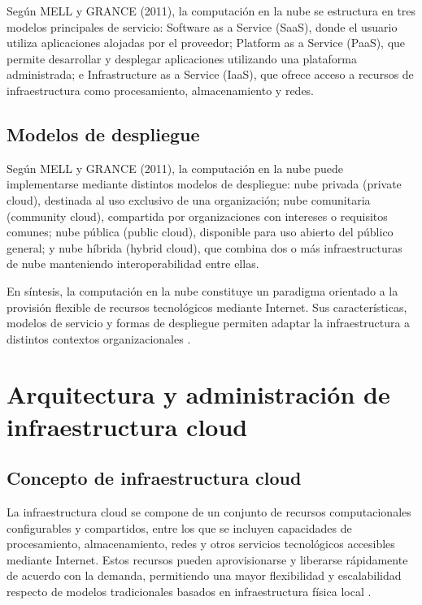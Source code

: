Según MELL y GRANCE (2011), la computación en la nube se estructura en tres modelos principales de servicio: Software as a Service (SaaS), donde el usuario utiliza aplicaciones alojadas por el proveedor; Platform as a Service (PaaS), que permite desarrollar y desplegar aplicaciones utilizando una plataforma administrada; e Infrastructure as a Service (IaaS), que ofrece acceso a recursos de infraestructura como procesamiento, almacenamiento y redes.

\subsection{Modelos de despliegue}

Según MELL y GRANCE (2011), la computación en la nube puede implementarse mediante distintos modelos de despliegue: nube privada (private cloud), destinada al uso exclusivo de una organización; nube comunitaria (community cloud), compartida por organizaciones con intereses o requisitos comunes; nube pública (public cloud), disponible para uso abierto del público general; y nube híbrida (hybrid cloud), que combina dos o más infraestructuras de nube manteniendo interoperabilidad entre ellas.

En síntesis, la computación en la nube constituye un paradigma orientado a la provisión flexible de recursos tecnológicos mediante Internet. Sus características, modelos de servicio y formas de despliegue permiten adaptar la infraestructura a distintos contextos organizacionales \parencite{Mell2011}.

\section{Arquitectura y administración de infraestructura cloud}

\subsection{Concepto de infraestructura cloud}

La infraestructura cloud se compone de un conjunto de recursos computacionales configurables y compartidos, entre los que se incluyen capacidades de procesamiento, almacenamiento, redes y otros servicios tecnológicos accesibles mediante Internet. Estos recursos pueden aprovisionarse y liberarse rápidamente de acuerdo con la demanda, permitiendo una mayor flexibilidad y escalabilidad respecto de modelos tradicionales basados en infraestructura física local \parencite{Mell2011}.

